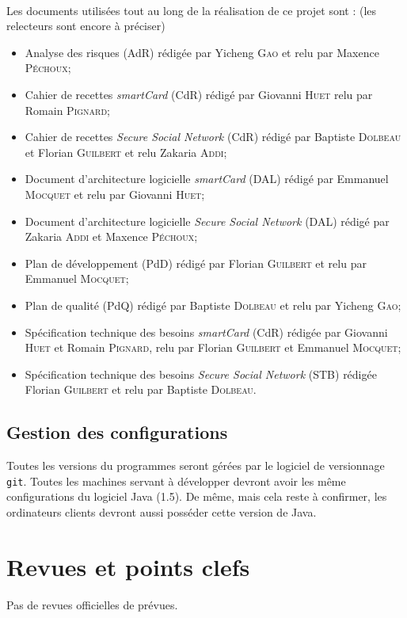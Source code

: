 \documentclass[a4paper,11pt,french]{article}
\begin{document}
\paragraph{}
Les documents utilisées tout au long de la réalisation de ce projet sont : 
(les relecteurs sont encore à préciser)
\begin{itemize}
 \item Analyse des risques (AdR) rédigée par Yicheng \textsc{Gao} et relu par
    Maxence \textsc{Péchoux};
 \item Cahier de recettes \emph{smartCard} (CdR) rédigé par Giovanni 
\textsc{Huet} relu par Romain \textsc{Pignard};
 \item Cahier de recettes \emph{Secure Social Network} (CdR) rédigé par 
 Baptiste \textsc{Dolbeau} et Florian \textsc{Guilbert} et relu Zakaria 
    \textsc{Addi};
 \item Document d'architecture logicielle \emph{smartCard} (DAL) rédigé par 
 Emmanuel \textsc{Mocquet} et relu par Giovanni \textsc{Huet};
 \item Document d'architecture logicielle \emph{Secure Social Network} (DAL) 
 rédigé par Zakaria \textsc{Addi} et Maxence \textsc{Péchoux};
 \item Plan de développement (PdD) rédigé par Florian \textsc{Guilbert} 
 et relu par Emmanuel \textsc{Mocquet};
 \item Plan de qualité (PdQ) rédigé par Baptiste \textsc{Dolbeau} et
 relu par Yicheng \textsc{Gao};
 \item Spécification technique des besoins \emph{smartCard} (CdR) rédigée par 
 Giovanni \textsc{Huet} et Romain \textsc{Pignard}, relu par Florian
 \textsc{Guilbert} et Emmanuel \textsc{Mocquet};
 \item Spécification technique des besoins \emph{Secure Social Network} (STB) 
    rédigée Florian \textsc{Guilbert} et relu par Baptiste \textsc{Dolbeau}.
\end{itemize}

\subsection{Gestion des configurations}
Toutes les versions du programmes seront gérées par le logiciel de versionnage 
\texttt{git}. Toutes les machines servant à développer devront
avoir les même configurations du logiciel Java (1.5). De même, mais cela reste
à confirmer, les ordinateurs clients devront aussi posséder cette version de
Java.

\section{Revues et points clefs}
Pas de revues officielles de prévues.
\end{document}
